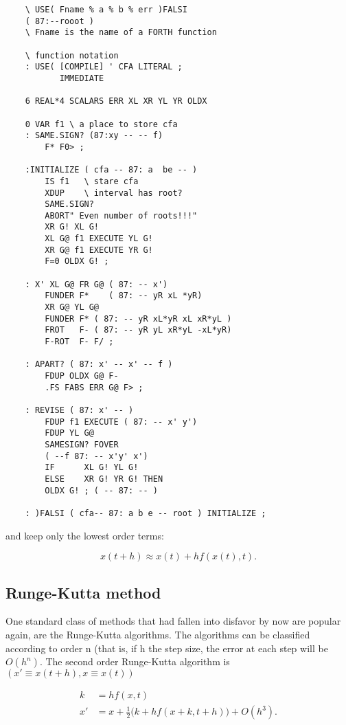 \begin{lstlisting}
    \ USE( Fname % a % b % err )FALSI
    ( 87:--rooot )
    \ Fname is the name of a FORTH function

    \ function notation
    : USE( [COMPILE] ' CFA LITERAL ;
           IMMEDIATE

    6 REAL*4 SCALARS ERR XL XR YL YR OLDX

    0 VAR f1 \ a place to store cfa
    : SAME.SIGN? (87:xy -- -- f)
        F* F0> ;

    :INITIALIZE ( cfa -- 87: a  be -- )
        IS f1   \ stare cfa
        XDUP    \ interval has root?
        SAME.SIGN?
        ABORT" Even number of roots!!!"
        XR G! XL G!
        XL G@ f1 EXECUTE YL G!
        XR G@ f1 EXECUTE YR G!
        F=0 OLDX G! ;

    : X' XL G@ FR G@ ( 87: -- x')
        FUNDER F*    ( 87: -- yR xL *yR)
        XR G@ YL G@
        FUNDER F* ( 87: -- yR xL*yR xL xR*yL )
        FROT   F- ( 87: -- yR yL xR*yL -xL*yR)
        F-ROT  F- F/ ;

    : APART? ( 87: x' -- x' -- f )
        FDUP OLDX G@ F-
        .FS FABS ERR G@ F> ;

    : REVISE ( 87: x' -- )
        FDUP f1 EXECUTE ( 87: -- x' y')
        FDUP YL G@
        SAMESIGN? FOVER
        ( --f 87: -- x'y' x')
        IF      XL G! YL G!
        ELSE    XR G! YR G! THEN
        OLDX G! ; ( -- 87: -- )

    : )FALSI ( cfa-- 87: a b e -- root ) INITIALIZE ;
\end{lstlisting}

and keep only the lowest order terms:

\begin{equation}
x(t+h) \approx x(t) + hf(x(t), t).
    \label{eq:06_18} 
\end{equation}

\subsection{Runge-Kutta method}

One standard class of methods that had fallen into disfavor by now are popular again, are the Runge-Kutta algorithms. The algorithms can be classified according to order n (that is, if h the step size, the error at each step will be $O(h^n)$. The second order Runge-Kutta algorithm is $(x' \equiv x(t+h) , x \equiv x(t) )$

\begin{equation}
\begin{aligned}
    k &= hf(x,t) \\
    x' &= x + \frac{1}{2}\big(k + hf(x+k, t+h)\big) + O(h^3).
    \label{eq:06_19} 
\end{aligned}
\end{equation}

